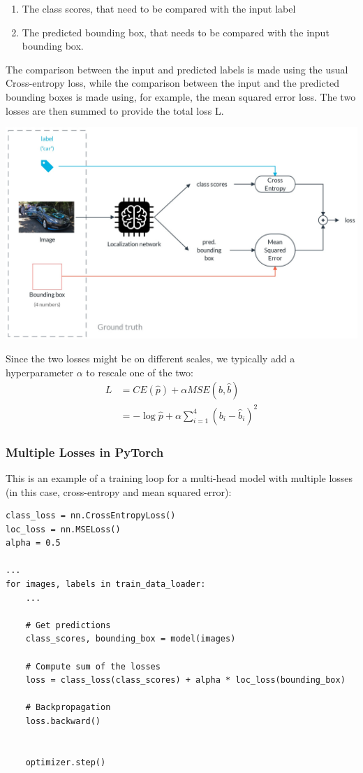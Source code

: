 \begin{enumerate}
    \item The class scores, that need to be compared with the input label
    \item The predicted bounding box, that needs to be compared with the input bounding box.
\end{enumerate}

The comparison between the input and predicted labels is made using the usual Cross-entropy loss, while the comparison between the input and the predicted bounding boxes is made using, for example, the mean squared error loss. The two losses are then summed to provide the total loss L.

\includegraphics[width=1\linewidth]{img//cnn//object/slide-2.jpeg}

Since the two losses might be on different scales, we typically add a hyperparameter \(\alpha\) to rescale one of the two: 
\begin{equation}
\begin{split}
L & = CE(\hat{p}) + \alpha MSE(b, \hat{b}) \\
& = -\log{\hat{p}} + \alpha \sum_{i=1}^4 (b_i - \hat{b}_i)^2
\end{split}
\end{equation}


\subsubsection{Multiple Losses in PyTorch}

This is an example of a training loop for a multi-head model with multiple losses (in this case, cross-entropy and mean squared error):
\begin{lstlisting}
class_loss = nn.CrossEntropyLoss()
loc_loss = nn.MSELoss()
alpha = 0.5

...
for images, labels in train_data_loader:
    ...

    # Get predictions
    class_scores, bounding_box = model(images)

    # Compute sum of the losses
    loss = class_loss(class_scores) + alpha * loc_loss(bounding_box)

    # Backpropagation
    loss.backward()


    optimizer.step()
\end{lstlisting}

